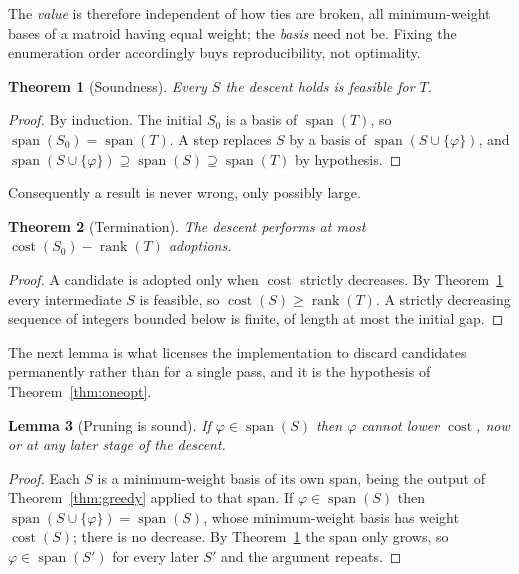 \documentclass[11pt,reqno]{amsart}
\theoremstyle{plain}
\newtheorem{theorem}{Theorem}[section]
\newtheorem{lemma}[theorem]{Lemma}
\theoremstyle{definition}
\theoremstyle{remark}
\newcommand{\rk}{\operatorname{rank}}
\newcommand{\spn}{\operatorname{span}}
\newcommand{\cost}{\operatorname{cost}}
\begin{document}
The \emph{value} is therefore independent of how ties are broken, all
minimum-weight bases of a matroid having equal weight; the \emph{basis} need not
be. Fixing the enumeration order accordingly buys reproducibility, not
optimality.

\begin{theorem}[Soundness]\label{thm:sound}
Every $S$ the descent holds is feasible for $T$.
\end{theorem}

\begin{proof}
By induction. The initial $S_0$ is a basis of $\spn(T)$, so $\spn(S_0)=\spn(T)$.
A step replaces $S$ by a basis of $\spn(S\cup\{\varphi\})$, and
$\spn(S\cup\{\varphi\})\supseteq\spn(S)\supseteq\spn(T)$ by hypothesis.
\end{proof}

Consequently a result is never wrong, only possibly large.

\begin{theorem}[Termination]\label{thm:term}
The descent performs at most $\cost(S_0)-\rk(T)$ adoptions.
\end{theorem}

\begin{proof}
A candidate is adopted only when $\cost$ strictly decreases. By
Theorem~\ref{thm:sound} every intermediate $S$ is feasible, so
$\cost(S)\ge \rk(T)$. A strictly decreasing sequence of integers bounded below is
finite, of length at most the initial gap.
\end{proof}

The next lemma is what licenses the implementation to discard candidates
permanently rather than for a single pass, and it is the hypothesis of
Theorem~\ref{thm:oneopt}.

\begin{lemma}[Pruning is sound]\label{lem:prune}
If $\varphi\in\spn(S)$ then $\varphi$ cannot lower $\cost$, now or at any later
stage of the descent.
\end{lemma}

\begin{proof}
Each $S$ is a minimum-weight basis of its own span, being the output of
Theorem~\ref{thm:greedy} applied to that span. If $\varphi\in\spn(S)$ then
$\spn(S\cup\{\varphi\})=\spn(S)$, whose minimum-weight basis has weight
$\cost(S)$; there is no decrease. By Theorem~\ref{thm:sound} the span only grows,
so $\varphi\in\spn(S')$ for every later $S'$ and the argument repeats.
\end{proof}
\end{document}
